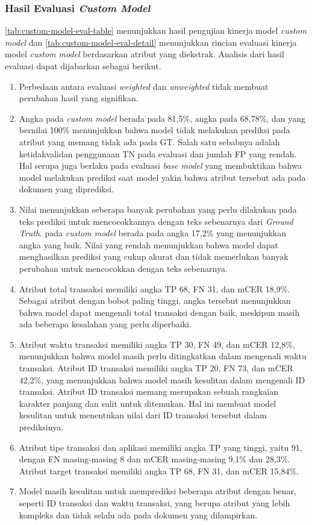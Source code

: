 \subsubsection{Hasil Evaluasi \emph{Custom Model}}
\label{subsubsec:hasil-evaluasi-custom-model}
\autoref{tab:custom-model-eval-table} menunjukkan hasil pengujian kinerja model \emph{custom model} dan \autoref{tab:custom-model-eval-detail} menunjukkan rincian evaluasi kinerja model \emph{custom model} berdasarkan atribut yang diekstrak. Analisis dari hasil evaluasi dapat dijabarkan sebagai berikut.
\begin{enumerate}
    \item Perbedaan antara evaluasi \emph{weighted} dan \emph{unweighted} tidak membuat perubahan hasil yang signifikan.
    \item Angka \fscore{} pada \emph{custom model} berada pada 81,5\%, angka \recall{} pada 68,78\%, dan \precision{} yang bernilai 100\% menunjukkan bahwa model tidak melakukan prediksi pada atribut yang memang tidak ada pada GT. Salah satu sebabnya adalah ketidakvalidan penggunaan TN pada evaluasi dan jumlah FP yang rendah. Hal serupa juga berlaku pada evaluasi \emph{base model} yang membuktikan bahwa model \donut{} melakukan prediksi saat model yakin bahwa atribut tersebut ada pada dokumen yang diprediksi.
    \item Nilai \mcer{} menunjukkan seberapa banyak perubahan yang perlu dilakukan pada teks prediksi untuk mencocokkannya dengan teks sebenarnya dari \emph{Ground Truth}. \mcer{} pada \emph{custom model} berada pada angka 17,2\% yang menunjukkan angka yang baik. Nilai \mcer{} yang rendah menunjukkan bahwa model dapat menghasilkan prediksi yang cukup akurat dan tidak memerlukan banyak perubahan untuk mencocokkan dengan teks sebenarnya.
    \item Atribut total transaksi memiliki angka TP 68, FN 31, dan mCER 18,9\%. Sebagai atribut dengan bobot paling tinggi, angka tersebut menunjukkan bahwa model dapat mengenali total transaksi dengan baik, meskipun masih ada beberapa kesalahan yang perlu diperbaiki.
    \item Atribut waktu transaksi memiliki angka TP 30, FN 49, dan mCER 12,8\%, menunjukkan bahwa model masih perlu ditingkatkan dalam mengenali waktu transaksi. Atribut ID transaksi memiliki angka TP 20, FN 73, dan mCER 42,2\%, yang menunjukkan bahwa model masih kesulitan dalam mengenali ID transaksi. Atribut ID transaksi memang merupakan sebuah rangkaian karakter panjang dan sulit untuk ditemukan. Hal ini membuat model kesulitan untuk menentukan nilai dari ID transaksi tersebut dalam prediksinya.
    \item Atribut tipe transaksi dan aplikasi memiliki angka TP yang tinggi, yaitu 91, dengan FN masing-masing 8 dan mCER masing-masing 9,1\% dan 28,3\%. Atribut target transaksi memiliki angka TP 68, FN 31, dan mCER 15,84\%. 
    \item Model masih kesulitan untuk memprediksi beberapa atribut dengan benar, seperti ID transaksi dan waktu transaksi, yang berupa atribut yang lebih kompleks dan tidak selalu ada pada dokumen yang dilampirkan.
\end{enumerate}
        
